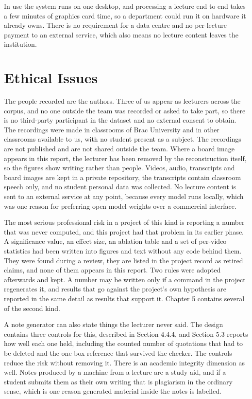 In use the system runs on one desktop, and processing a lecture end to end takes a few
minutes of graphics card time, so a department could run it on hardware it already owns.
There is no requirement for a data centre and no per-lecture payment to an external
service, which also means no lecture content leaves the institution.

\section{Ethical Issues}

The people recorded are the authors. Three of us appear as lecturers across the corpus,
and no one outside the team was recorded or asked to take part, so there is no
third-party participant in the dataset and no external consent to obtain. The recordings
were made in classrooms of Brac University and in other classrooms available to us, with
no student present as a subject. The recordings are not published and are not shared
outside the team. Where a board image appears in this report, the lecturer has been
removed by the reconstruction itself, so the figures show writing rather than people.
Videos, audio, transcripts and board images are kept in a private repository, the
transcripts contain classroom speech only, and no student personal data was collected. No
lecture content is sent to an external service at any point, because every model runs
locally, which was one reason for preferring open model weights over a commercial
interface.

The most serious professional risk in a project of this kind is reporting a number that
was never computed, and this project had that problem in its earlier phase. A
significance value, an effect size, an ablation table and a set of per-video statistics
had been written into figures and text without any code behind them. They were found
during a review, they are listed in the project record as retired claims, and none of
them appears in this report. Two rules were adopted afterwards and kept. A number may be
written only if a command in the project regenerates it, and results that go against the
project's own hypothesis are reported in the same detail as results that support it.
Chapter 5 contains several of the second kind.

A note generator can also state things the lecturer never said. The design contains three
controls for this, described in Section 4.4.4, and Section 5.3 reports how well each one
held, including the counted number of quotations that had to be deleted and the one box
reference that survived the checker. The controls reduce the risk without removing it.
There is an academic integrity dimension as well. Notes produced by a machine from a
lecture are a study aid, and if a student submits them as their own writing that is
plagiarism in the ordinary sense, which is one reason generated material inside the notes
is labelled.


